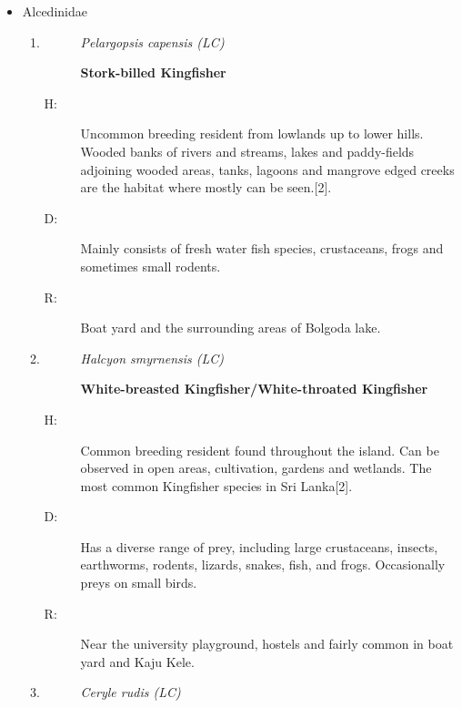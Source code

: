 \begin{itemize}
\begin{enumerate}
\begin{description}
\item[R: ]%
Recorded from hotspot 2 inside Kaju kele.%
\end{description}%
\end{enumerate}%
\item%
Alcedinidae%
\begin{enumerate}%
\item%
\begin{description}%
\item[]%
\textit{Pelargopsis capensis (LC)}%
\item[]%
\textbf{Stork{-}billed Kingfisher}%
\end{description}%
\begin{description}%
\item[H: ]%
Uncommon breeding resident from lowlands up to lower hills. Wooded banks of rivers and streams, lakes and paddy-fields adjoining wooded areas, tanks, lagoons and mangrove edged creeks are the habitat where mostly can be seen.{[}2{]}.%
\item[D: ]%
Mainly consists of fresh water fish species, crustaceans, frogs and sometimes small rodents.%
\item[R: ]%
Boat yard and the surrounding areas of Bolgoda lake.%
\end{description}%
\item%
\begin{description}%
\item[]%
\textit{Halcyon smyrnensis (LC)}%
\item[]%
\textbf{White{-}breasted Kingfisher/White{-}throated Kingfisher}%
\end{description}%
\begin{description}%
\item[H: ]%
Common breeding resident found throughout the island. Can be observed in open areas, cultivation, gardens and wetlands. The most common Kingfisher species in Sri Lanka{[}2{]}.%
\item[D: ]%
Has a diverse range of prey, including large crustaceans, insects, earthworms, rodents, lizards, snakes, fish, and frogs. Occasionally preys on small birds.%
\item[R: ]%
Near the university playground, hostels and fairly common in boat yard and Kaju Kele.%
\end{description}%
\item%
\begin{description}%
\item[]%
\textit{Ceryle rudis (LC)}%
\item[]%

\end{description}
\end{enumerate}
\end{itemize}
